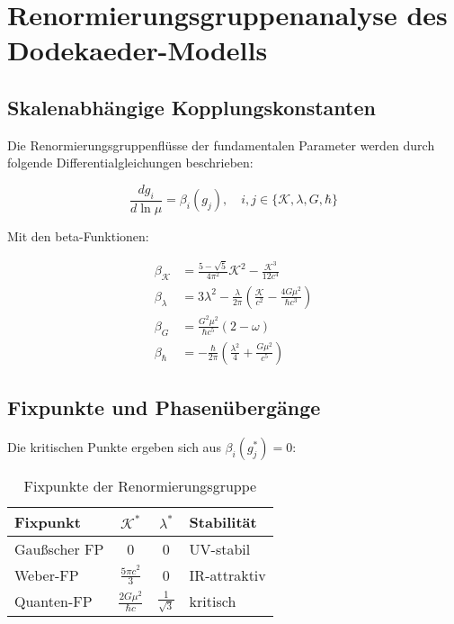 \section{Renormierungsgruppenanalyse des Dodekaeder-Modells}
\subsection{Skalenabhängige Kopplungskonstanten}

Die Renormierungsgruppenflüsse der fundamentalen Parameter werden durch folgende Differentialgleichungen beschrieben:

\begin{equation}
\frac{dg_i}{d\ln\mu} = \beta_i(g_j), \quad i,j \in \{\mathcal{K},\lambda,G,\hbar\}
\end{equation}

Mit den beta-Funktionen:

\begin{equation}
\begin{aligned}
\beta_\mathcal{K} &= \frac{5-\sqrt{5}}{4\pi^2}\mathcal{K}^2 - \frac{\mathcal{K}^3}{12c^4} \\
\beta_\lambda &= 3\lambda^2 - \frac{\lambda}{2\pi}\left(\frac{\mathcal{K}}{c^2}-\frac{4G\mu^2}{\hbar c^3}\right) \\
\beta_G &= \frac{G^2\mu^2}{\hbar c^5}(2-\omega) \\
\beta_\hbar &= -\frac{\hbar}{2\pi}\left(\frac{\lambda^2}{4} + \frac{G\mu^2}{c^5}\right)
\end{aligned}
\end{equation}

\subsection{Fixpunkte und Phasenübergänge}

Die kritischen Punkte ergeben sich aus $\beta_i(g_j^*) = 0$:

\begin{table}[h]
\centering
\begin{tabular}{lccl}
\toprule
Fixpunkt & $\mathcal{K}^*$ & $\lambda^*$ & Stabilität \\
\midrule
Gaußscher FP & 0 & 0 & UV-stabil \\
Weber-FP & $\frac{5\pi c^2}{3}$ & 0 & IR-attraktiv \\
Quanten-FP & $\frac{2G\mu^2}{\hbar c}$ & $\frac{1}{\sqrt{3}}$ & kritisch \\
\bottomrule
\end{tabular}
\caption{Fixpunkte der Renormierungsgruppe}
\end{table}

